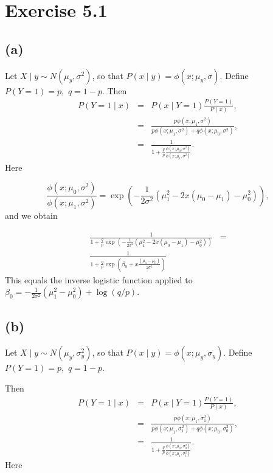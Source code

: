\section*{Exercise 5.1}

\subsection*{(a)}

Let $X\mid y\sim N(\mu_{y},\sigma^{2})$, so that $P(x\mid y)=\phi(x;\mu_{y},\sigma)$.
Define $P(Y=1)=p,$ $q=1-p$. Then 
\begin{eqnarray*}
P(Y=1\mid x) & = & P(x\mid Y=1)\frac{P(Y=1)}{P(x)},\\
 & = & \frac{p\phi(x;\mu_{1},\sigma^{2})}{p\phi(x;\mu_{1},\sigma^{2})+q\phi(x;\mu_{0},\sigma^{2})},\\
 & = & \frac{1}{1+\frac{q}{p}\frac{\phi(x;\mu_{0},\sigma^{2})}{\phi(x;\mu_{1},\sigma^{2})}}.
\end{eqnarray*}
Here

\[
\frac{\phi(x;\mu_{0},\sigma^{2})}{\phi(x;\mu_{1},\sigma^{2})}=\exp\left(-\frac{1}{2\sigma^{2}}(\mu_{1}^{2}-2x(\mu_{0}-\mu_{1})-\mu_{0}^{2})\right),
\]
and we obtain

\begin{eqnarray*}
\frac{1}{1+\frac{q}{p}\exp\left(-\frac{1}{2\sigma^{2}}(\mu_{1}^{2}-2x(\mu_{0}-\mu_{1})-\mu_{0}^{2})\right)} & =\\
\frac{1}{1+\frac{q}{p}\exp\left(\beta_{0}+x\frac{(\mu_{1}-\mu_{0})}{2\sigma^{2}}\right)}
\end{eqnarray*}
This equals the inverse logistic function applied to $\beta_{0}=-\frac{1}{2\sigma^{2}}(\mu_{1}^{2}-\mu_{0}^{2})+\log(q/p)$.

\subsection*{(b)}

Let $X\mid y\sim N(\mu_{y},\sigma_{y}^{2})$, so that $P(x\mid y)=\phi(x;\mu_{y},\sigma_{y})$.
Define $P(Y=1)=p,$ $q=1-p$. 

Then 
\begin{eqnarray*}
P(Y=1\mid x) & = & P(x\mid Y=1)\frac{P(Y=1)}{P(x)},\\
 & = & \frac{p\phi(x;\mu_{1},\sigma_{1}^{2})}{p\phi(x;\mu_{1},\sigma_{1}^{2})+q\phi(x;\mu_{0},\sigma_{0}^{2})},\\
 & = & \frac{1}{1+\frac{q}{p}\frac{\phi(x;\mu_{0},\sigma_{0}^{2})}{\phi(x;\mu_{1},\sigma_{1}^{2})}}.
\end{eqnarray*}
Here

